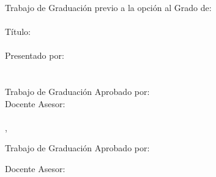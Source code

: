 \begingroup
\singlespacing
\thispagestyle{empty}
\begin{center}
\MakeUppercase{\UESuniversity}\\[0.35cm]
\MakeUppercase{\UESfaculty}\\[0.35cm]
\MakeUppercase{\UESschool}\\[1.5cm]
Trabajo de Graduación previo a la opción al Grado de:\\[0.2cm]
\textbf{\MakeUppercase{\UESdegree}}\\[0.8cm]
Título:\\[0.2cm]
\textbf{\MakeUppercase{\UEStitle}}\\[1.0cm]
Presentado por:\\[0.2cm]
\textbf{\MakeUppercase{\UESauthori}}\\[0.2cm]
\textbf{\MakeUppercase{\UESauthorii}}\\[1.0cm]

Trabajo de Graduación Aprobado por:\\[0.8cm]
Docente Asesor:\\[0.2cm]
\textbf{\MakeUppercase{\UESadvisor}}\\[1.2cm]
{\MakeUppercase{\UEScity, \UESmonthyear}}
\end{center}
\clearpage

\thispagestyle{empty}
\begin{center}
\hspace{0.5cm}Trabajo de Graduación Aprobado por:
\end{center}

\vspace{3cm}


Docente Asesor:\par
\vspace{1.5cm}
\begin{center}
\textbf{\MakeUppercase{\UESadvisor}}
\end{center}

\clearpage

\endgroup
